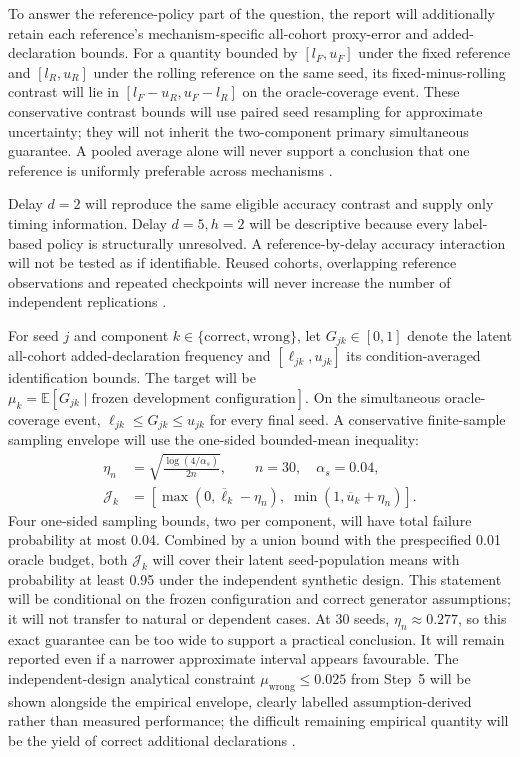 To answer the reference-policy part of the question, the report will additionally retain each reference's mechanism-specific all-cohort proxy-error and added-declaration bounds. For a quantity bounded by $[l_F,u_F]$ under the fixed reference and $[l_R,u_R]$ under the rolling reference on the same seed, its fixed-minus-rolling contrast will lie in $[l_F-u_R,u_F-l_R]$ on the oracle-coverage event. These conservative contrast bounds will use paired seed resampling for approximate uncertainty; they will not inherit the two-component primary simultaneous guarantee. A pooled average alone will never support a conclusion that one reference is uniformly preferable across mechanisms \cite{window,hoeffding}.

Delay $d=2$ will reproduce the same eligible accuracy contrast and supply only timing information. Delay $d=5,h=2$ will be descriptive because every label-based policy is structurally unresolved. A reference-by-delay accuracy interaction will not be tested as if identifiable. Reused cohorts, overlapping reference observations and repeated checkpoints will never increase the number of independent replications \cite{alencar,souza}.

For seed $j$ and component $k\in\{\mathrm{correct},\mathrm{wrong}\}$, let $G_{jk}\in[0,1]$ denote the latent all-cohort added-declaration frequency and $[\ell_{jk},u_{jk}]$ its condition-averaged identification bounds. The target will be $\mu_k=\mathbb E[G_{jk}\mid\text{frozen development configuration}]$. On the simultaneous oracle-coverage event, $\ell_{jk}\leq G_{jk}\leq u_{jk}$ for every final seed. A conservative finite-sample sampling envelope will use the one-sided bounded-mean inequality:
\begin{align}
\eta_n&=\sqrt{\frac{\log(4/\alpha_s)}{2n}},\qquad n=30,\quad \alpha_s=0.04,\\
\mathcal J_k&=\left[\max(0,\overline\ell_k-\eta_n),\;
\min(1,\overline u_k+\eta_n)\right].
\end{align}
Four one-sided sampling bounds, two per component, will have total failure probability at most 0.04. Combined by a union bound with the prespecified 0.01 oracle budget, both $\mathcal J_k$ will cover their latent seed-population means with probability at least 0.95 under the independent synthetic design. This statement will be conditional on the frozen configuration and correct generator assumptions; it will not transfer to natural or dependent cases. At 30 seeds, $\eta_n\approx0.277$, so this exact guarantee can be too wide to support a practical conclusion. It will remain reported even if a narrower approximate interval appears favourable. The independent-design analytical constraint $\mu_{\mathrm{wrong}}\leq0.025$ from Step~5 will be shown alongside the empirical envelope, clearly labelled assumption-derived rather than measured performance; the difficult remaining empirical quantity will be the yield of correct additional declarations \cite{hoeffding}.

